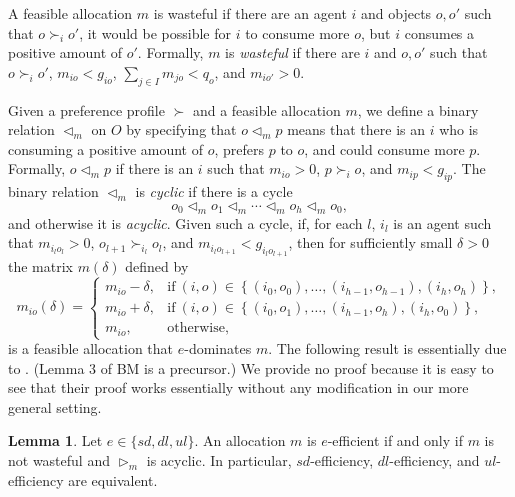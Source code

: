 \documentclass[12pt]{article}
\theoremstyle{definition}
\newtheorem{lem}{Lemma}
\begin{document}
A feasible allocation $m$ is wasteful if there are an agent $i$ and objects $o,o'$ such that $o \succ_i o'$, it would be possible for $i$ to consume more $o$, but $i$ consumes a positive amount of $o'$.  Formally, $m$ is \emph{wasteful}  if there are $i$ and $o,o'$ such that $o \succ_i o'$, $m_{io} < g_{io}$,  $\sum_{j \in I} m_{jo} < q_o$, and $m_{io'} > 0$. 

Given a preference profile $\succ$ and a feasible allocation $m$, we define a binary relation $\lhd_m$ on $O$ by specifying that $o \lhd_m p$ means that there is an $i$ who is consuming a positive amount of $o$, prefers $p$ to $o$, and could consume more $p$.  
Formally, $o \lhd_m p$ if there is an $i$ such that $m_{io} > 0$, $p \succ_i o$, and $m_{ip} < g_{ip}$.
The binary relation $\lhd_m$ is \emph{cyclic} if there is a cycle $$o_0 \lhd_m o_1 \lhd_m \cdots \lhd_m o_h \lhd_m o_0,$$ and otherwise it is \emph{acyclic}.  Given such a cycle, if, for each $l$, $i_l$ is an agent such that  $m_{i_lo_l} > 0$, $o_{l+1} \succ_{i_l} o_l$, and $m_{i_lo_{l+1}} < g_{i_lo_{l+1}}$, then
for sufficiently small $\delta > 0$ the matrix $m(\delta)$ defined by 
$$
m_{io}(\delta) =
\begin{cases}
m_{io} - \delta, &\text{if}~(i,o) \in \left\{(i_0,o_0),\hdots,(i_{h-1},o_{h-1}),(i_h,o_h)\right\}, \\
m_{io} + \delta, &\text{if}~(i,o) \in \left\{(i_0,o_1),\hdots,(i_{h-1},o_h),(i_h,o_0)\right\}, \\
m_{io}, &\text{otherwise}, 
\end{cases}
$$
is a feasible allocation that $e$-dominates $m$. The following result is essentially due to \cite{cd16}.  (Lemma 3 of BM is a precursor.)  We provide no proof because it is easy to see that their proof works essentially without any modification in our more general setting.

\begin{lem}\label{lem:cyclic} 
Let $e \in \{sd,dl,ul\}$.  An allocation $m$ is $e$-efficient if and only if $m$ is not wasteful and $\rhd_m$ is acyclic. In particular,  $sd$-efficiency, $dl$-efficiency, and $ul$-efficiency are equivalent. 
\end{lem}
\end{document}
